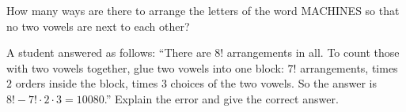 How many ways are there to arrange the letters of the word MACHINES so that no two vowels are next to each other?

A student answered as follows: ``There are $8!$ arrangements in all. To count those with two vowels together, glue two vowels into one block: $7!$ arrangements, times $2$ orders inside the block, times $3$ choices of the two vowels. So the answer is $8!-7!\cdot2\cdot3=10080$.'' Explain the error and give the correct answer.
